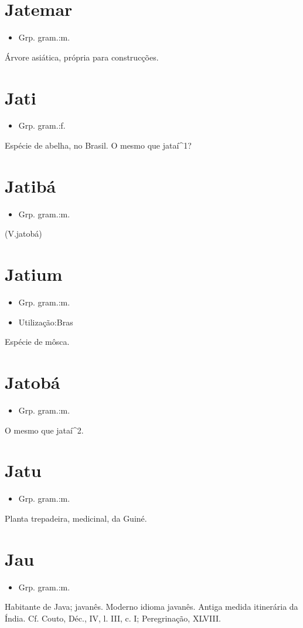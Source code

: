 \documentclass{article}
\begin{document}
\section{Jatemar}
\begin{itemize}
\item {Grp. gram.:m.}
\end{itemize}
Árvore asiática, própria para construcções.
\section{Jati}
\begin{itemize}
\item {Grp. gram.:f.}
\end{itemize}
Espécie de abelha, no Brasil.
O mesmo que \textunderscore jataí\textunderscore ^1?
\section{Jatibá}
\begin{itemize}
\item {Grp. gram.:m.}
\end{itemize}
(V.jatobá)
\section{Jatium}
\begin{itemize}
\item {Grp. gram.:m.}
\end{itemize}
\begin{itemize}
\item {Utilização:Bras}
\end{itemize}
Espécie de môsca.
\section{Jatobá}
\begin{itemize}
\item {Grp. gram.:m.}
\end{itemize}
O mesmo que \textunderscore jataí\textunderscore ^2.
\section{Jatu}
\begin{itemize}
\item {Grp. gram.:m.}
\end{itemize}
Planta trepadeira, medicinal, da Guiné.
\section{Jau}
\begin{itemize}
\item {Grp. gram.:m.}
\end{itemize}
Habitante de Java; javanês.
Moderno idioma javanês.
Antiga medida itinerária da Índia. Cf. Couto, \textunderscore Déc.\textunderscore , IV, l. III, c. I; \textunderscore Peregrinação\textunderscore , XLVIII.
\end{document}
